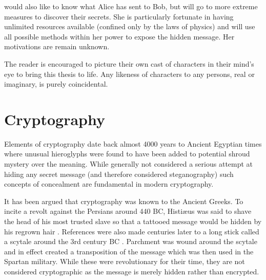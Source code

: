  would also like to know what Alice has sent to Bob, but will go to more extreme measures to discover their secrets. She is particularly fortunate in having unlimited resources available (confined only by the laws of physics) and will use all possible methods within her power to expose the hidden message. Her motivations are remain unknown.

The reader is encouraged to picture their own cast of characters in their mind's eye to bring this thesis to life. Any likeness of characters to any persons, real or imaginary, is purely coincidental.

\section{Cryptography}
\label{sec1:crypto}

Elements of cryptography date back almost 4000 years to Ancient Egyptian times where unusual hieroglyphs were found to have been added to potential shroud mystery over the meaning\cite{singh1999code}. While generally not considered a serious attempt at hiding any secret message (and therefore considered steganography) such concepts of concealment are fundamental in modern cryptography.

It has been argued that cryptography was known to the Ancient Greeks. To incite a revolt against the Persians around 440 BC, Histi{\ae}us was said to shave the head of his most trusted slave so that a tattooed message would be hidden by his regrown hair \cite{Herodotus}. References were also made centuries later to a long stick called a scytale around the 3rd century BC \cite{Deipnosophistae}. Parchment was wound around the scytale and in effect created a transposition of the message which was then used in the Spartan military. While these were revolutionary for their time, they are not considered cryptographic as the message is merely hidden rather than encrypted.




